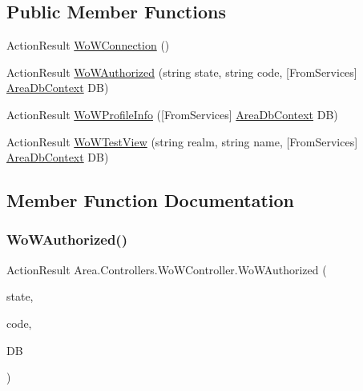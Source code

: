 \subsection*{Public Member Functions}
\begin{DoxyCompactItemize}
\item 
Action\+Result \mbox{\hyperlink{classArea_1_1Controllers_1_1WoWController_ac3ad5676d327374b4bb8430732ce5c3d}{Wo\+W\+Connection}} ()
\item 
Action\+Result \mbox{\hyperlink{classArea_1_1Controllers_1_1WoWController_a7e48e05a2bf050d822939b9f0be48430}{Wo\+W\+Authorized}} (string state, string code, \mbox{[}From\+Services\mbox{]} \mbox{\hyperlink{classArea_1_1DAT_1_1AreaDbContext}{Area\+Db\+Context}} DB)
\item 
Action\+Result \mbox{\hyperlink{classArea_1_1Controllers_1_1WoWController_af7c8c765c5977d7f72fc4a6a31db85ce}{Wo\+W\+Profile\+Info}} (\mbox{[}From\+Services\mbox{]} \mbox{\hyperlink{classArea_1_1DAT_1_1AreaDbContext}{Area\+Db\+Context}} DB)
\item 
Action\+Result \mbox{\hyperlink{classArea_1_1Controllers_1_1WoWController_a17e036e37a19590d448970b39a6f1282}{Wo\+W\+Test\+View}} (string realm, string name, \mbox{[}From\+Services\mbox{]} \mbox{\hyperlink{classArea_1_1DAT_1_1AreaDbContext}{Area\+Db\+Context}} DB)
\end{DoxyCompactItemize}


\subsection{Member Function Documentation}
\mbox{\label{classArea_1_1Controllers_1_1WoWController_a7e48e05a2bf050d822939b9f0be48430}} 
\subsubsection{\texorpdfstring{Wo\+W\+Authorized()}{WoWAuthorized()}}
{\footnotesize\ttfamily Action\+Result Area.\+Controllers.\+Wo\+W\+Controller.\+Wo\+W\+Authorized (\begin{DoxyParamCaption}\item[{string}]{state,  }\item[{string}]{code,  }\item[{\mbox{[}\+From\+Services\mbox{]} \mbox{\hyperlink{classArea_1_1DAT_1_1AreaDbContext}{Area\+Db\+Context}}}]{DB }\end{DoxyParamCaption})\hspace{0.3cm}{\ttfamily [inline]}}

